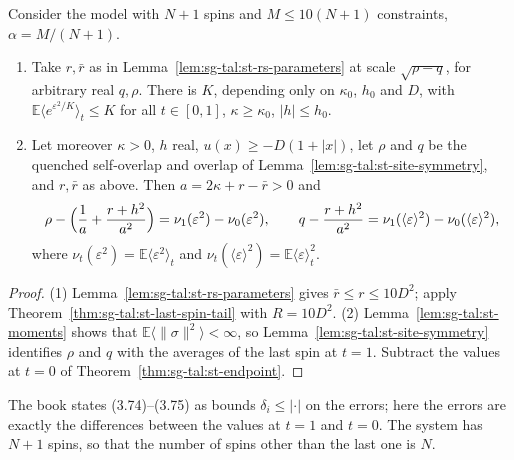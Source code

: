 \begin{theorem}
\label{thm:sg-tal:st-rs-choice}
  \leanok
Consider the model with $N+1$ spins and $M\le10(N+1)$ constraints, $\alpha=M/(N+1)$.
\begin{enumerate}
\item Take $r,\bar r$ as in Lemma~\ref{lem:sg-tal:st-rs-parameters} at scale $\sqrt{\rho-q}$, for arbitrary real
$q,\rho$. There is $K$, depending only on $\kappa_0$, $h_0$ and $D$, with
$\mathbb E\langle e^{\varepsilon^2/K}\rangle_t\le K$ for all $t\in[0,1]$, $\kappa\ge\kappa_0$, $|h|\le h_0$.
\item Let moreover $\kappa>0$, $h$ real, $u(x)\ge-D(1+|x|)$, let $\rho$ and $q$ be the quenched self-overlap
and overlap of Lemma~\ref{lem:sg-tal:st-site-symmetry}, and $r,\bar r$ as above. Then
$a=2\kappa+r-\bar r>0$ and
\[
\rho-\Bigl(\frac1a+\frac{r+h^2}{a^2}\Bigr)=\nu_1(\varepsilon^2)-\nu_0(\varepsilon^2),\qquad
q-\frac{r+h^2}{a^2}=\nu_1(\langle\varepsilon\rangle^2)-\nu_0(\langle\varepsilon\rangle^2),
\]
where $\nu_t(\varepsilon^2)=\mathbb E\langle\varepsilon^2\rangle_t$ and
$\nu_t(\langle\varepsilon\rangle^2)=\mathbb E\langle\varepsilon\rangle_t^2$.
\end{enumerate}
\end{theorem}
\begin{proof}
  \leanok
(1) Lemma~\ref{lem:sg-tal:st-rs-parameters} gives $\bar r\le r\le10D^2$; apply
Theorem~\ref{thm:sg-tal:st-last-spin-tail} with $R=10D^2$. (2) Lemma~\ref{lem:sg-tal:st-moments} shows that
$\mathbb E\langle\|\sigma\|^2\rangle<\infty$, so Lemma~\ref{lem:sg-tal:st-site-symmetry} identifies $\rho$ and
$q$ with the averages of the last spin at $t=1$. Subtract the values at $t=0$ of
Theorem~\ref{thm:sg-tal:st-endpoint}.
\end{proof}

\begin{remark}\label{rem:sg-tal:st-prop-324}
The book states (3.74)--(3.75) as bounds $\delta_i\le|\cdot|$ on the errors; here the errors are exactly the
differences between the values at $t=1$ and $t=0$. The system has $N+1$ spins, so that the number of spins
other than the last one is $N$.
\end{remark}

